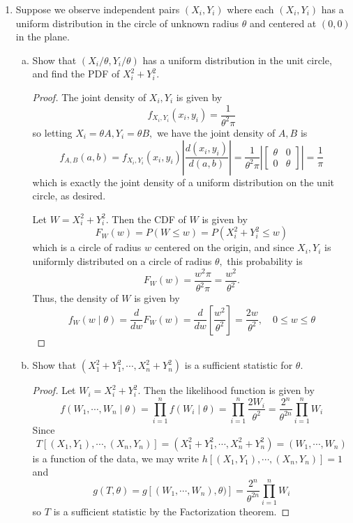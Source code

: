 \documentclass{article}
\begin{document}
\begin{enumerate}
\begin{enumerate}[(a)]
		\end{enumerate}

	\item Suppose we observe independent pairs $(X_i, Y_i)$ where each $(X_i, Y_i)$ has a uniform distribution in the circle of unknown radius $\theta$ and centered at $(0, 0)$ in the plane.

		\begin{enumerate}[(a)]
			\item Show that $(X_i/\theta, Y_i/\theta)$ has a uniform distribution in the unit circle, and find the PDF of $X_i^2+Y_i^2.$
				\begin{proof}
					The joint density of $X_i, Y_i$ is given by \[f_{X_i, Y_i}(x_i, y_i)=\frac{1}{\theta^2\pi}\] so letting $X_i=\theta A, Y_i=\theta B,$ we have the joint density of $A, B$ is \[f_{A, B}(a, b)=f_{X_i, Y_i}(x_i, y_i)\left\lvert \frac{d(x_i, y_i)}{d(a, b)} \right\rvert = \frac{1}{\theta^2\pi} \left\lvert \begin{bmatrix}
						\theta & 0 \\ 0 & \theta
				\end{bmatrix}\right\rvert = \frac{1}{\pi}\] which is exactly the joint density of a uniform distribution on the unit circle, as desired.

				Let $W=X_i^2+Y_i^2.$ Then the CDF of $W$ is given by \[F_W(w)=P(W\le w)=P(X_i^2+Y_i^2\le w)\] which is a circle of radius $w$ centered on the origin, and since $X_i, Y_i$ is uniformly distributed on a circle of radius $\theta,$ this probability is \[F_W(w)=\frac{w^2\pi}{\theta^2\pi}=\frac{w^2}{\theta^2}.\] Thus, the density of $W$ is given by \[f_W(w\mid\theta)=\frac{d}{dw}F_W(w)=\frac{d}{dw}\left[ \frac{w^2}{\theta^2} \right]=\frac{2w}{\theta^2}, \quad 0\le w\le \theta\]
				
				\end{proof}

			\item Show that $(X_1^2+Y_1^2, \cdots, X_n^2+Y_n^2)$ is a sufficient statistic for $\theta.$
				\begin{proof}
					Let $W_i=X_i^2+Y_i^2.$ Then the likelihood function is given by \[f(W_1, \cdots, W_n\mid \theta) = \prod_{i=1}^{n}f(W_i\mid\theta)=\prod_{i=1}^{n}\frac{2W_i}{\theta^2} = \frac{2^n}{\theta^{2n}}\prod_{i=1}^{n}W_i\] Since \[T\left[ (X_1, Y_1), \cdots, (X_n, Y_n) \right] = (X_1^2+Y_1^2, \cdots, X_n^2+Y_n^2)=(W_1, \cdots, W_n)\] is a function of the data, we may write $h\left[ (X_1, Y_1), \cdots, (X_n, Y_n) \right] = 1$ and \[g(T, \theta) = g[(W_1, \cdots, W_n), \theta)]= \frac{2^n}{\theta^{2n}}\prod_{i=1}^{n} W_i\] so $T$ is a sufficient statistic by the Factorization theorem.
					

\end{proof}
\end{enumerate}
\end{enumerate}
\end{document}
